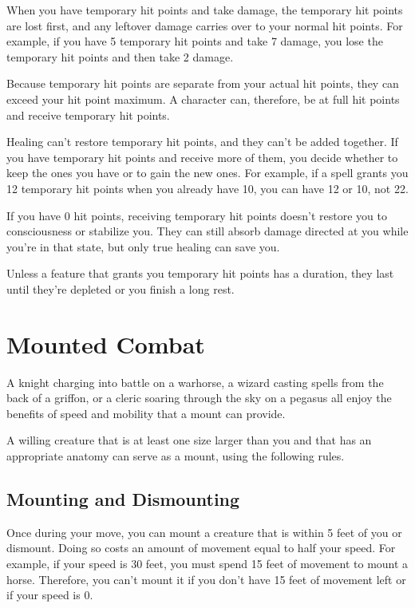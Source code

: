When you have temporary hit points and take damage, the temporary hit points are lost first, and any leftover damage carries over to your normal hit points. For example, if you have 5 temporary hit points and take 7 damage, you lose the temporary hit points and then take 2 damage.

Because temporary hit points are separate from your actual hit points, they can exceed your hit point maximum. A character can, therefore, be at full hit points and receive temporary hit points.

Healing can't restore temporary hit points, and they can't be added together. If you have temporary hit points and receive more of them, you decide whether to keep the ones you have or to gain the new ones. For example, if a spell grants you 12 temporary hit points when you already have 10, you can have 12 or 10, not 22.

If you have 0 hit points, receiving temporary hit points doesn't restore you to consciousness or stabilize you. They can still absorb damage directed at you while you're in that state, but only true healing can save you.

Unless a feature that grants you temporary hit points has a duration, they last until they're depleted or you finish a long rest.

\section{Mounted Combat}

A knight charging into battle on a warhorse, a wizard casting spells from the back of a griffon, or a cleric soaring through the sky on a pegasus all enjoy the benefits of speed and mobility that a mount can provide.

A willing creature that is at least one size larger than you and that has an appropriate anatomy can serve as a mount, using the following rules.

\subsection{Mounting and Dismounting}

Once during your move, you can mount a creature that is within 5 feet of you or dismount. Doing so costs an amount of movement equal to half your speed. For example, if your speed is 30 feet, you must spend 15 feet of movement to mount a horse. Therefore, you can't mount it if you don't have 15 feet of movement left or if your speed is 0.

